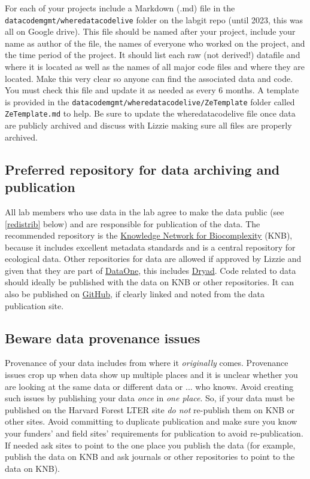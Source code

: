 \documentclass[11pt,a4paper,oneside]{article}
\begin{document}
For each of your projects include a Markdown (.md) file in the \verb|datacodemgmt/wheredatacodelive| folder on the labgit repo (until 2023, this was all on Google drive). This file should be named after your project, include your name as author of the file, the names of everyone who worked on the project, and the time period of the project. It should list each raw (not derived!) datafile and where it is located as well as the names of all major code files and where they are located. Make this very clear so anyone can find the associated data and code. You must check this file and update it as needed as every 6 months. A template is provided in the \verb|datacodemgmt/wheredatacodelive/ZeTemplate| folder called \verb|ZeTemplate.md| to help. Be sure to update the wheredatacodelive file once data are publicly archived and discuss with Lizzie making sure all files are properly archived.

\subsection{Preferred repository for data archiving and publication}
All lab members who use data in the lab agree to make the data public (see \ref{redistrib} below) and are responsible for publication of the data. The recommended repository is the \href{http://knb.ecoinformatics.org/}{Knowledge Network for Biocomplexity} (KNB), because it includes excellent metadata standards and is a central repository for ecological data. Other repositories for data are allowed if approved by Lizzie and given that they are part of \href{https://www.dataone.org/}{DataOne}, this includes \href{http://datadryad.org/}{Dryad}. Code related to data should ideally be published with the data on KNB or other repositories. It can also be published on \href{https://github.com/}{GitHub}, if clearly linked and noted from the data publication site.

\subsection{Beware data provenance issues}
Provenance of your data includes from where it \emph{originally} comes. Provenance issues crop up when data show up multiple places and it is unclear whether you are looking at the same data or different data or ... who knows. Avoid creating such issues by publishing your data \emph{once} in \emph{one place}. So, if your data must be published on the Harvard Forest LTER site \emph{do not} re-publish them on KNB or other sites. Avoid committing to duplicate publication and make sure you know your funders' and field sites' requirements for publication to avoid re-publication. If needed ask sites to point to the one place you publish the data (for example, publish the data on KNB and ask journals or other repositories to point to the data on KNB).
\end{document}
